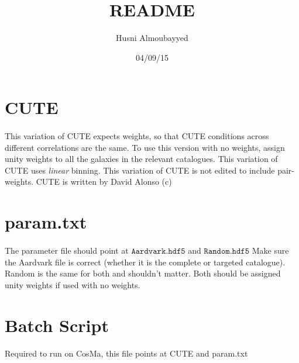 \documentclass[11pt, oneside]{article}   	%
\title{README}
\author{{\small Husni Almoubayyed}}
\date{04/09/15}							%
\begin{document}
\maketitle
\section{CUTE}
\paragraph{}This variation of CUTE expects weights, so that CUTE conditions across different correlations are the same. To use this version with no weights, assign unity weights to all the galaxies in the relevant catalogues.
This variation of CUTE uses \emph{linear} binning. 
\break
\break
\noindent This variation of CUTE is not edited to include pair-weights.
\break
\break
\noindent CUTE is written by David Alonso (c)

\section{param.txt}
\paragraph{} The parameter file should point at $\mathtt{Aardvark.hdf5}$ and $\mathtt{Random.hdf5}$
Make sure the Aardvark file is correct (whether it is the complete or targeted catalogue). Random is the same for both and shouldn't matter. Both should be assigned unity weights if used with no weights.

\section{Batch Script}
\paragraph{} Required to run on CosMa, this file points at CUTE and param.txt

\paragraph{} 
\end{document}
